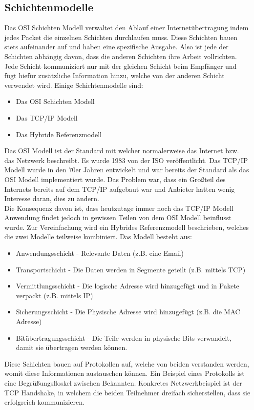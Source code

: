 \documentclass{article}
\begin{document}
	 \subsection{Schichtenmodelle}
	 Das OSI Schichten Modell verwaltet den Ablauf einer Internetübertragung indem jedes Packet die einzelnen Schichten durchlaufen muss. Diese Schichten bauen stets aufeinander auf und haben eine spezifische Ausgabe. Also ist jede der Schichten abhängig davon, dass die anderen Schichten ihre Arbeit vollrichten. Jede Schicht kommuniziert nur mit der gleichen Schicht beim Empfänger und fügt hiefür zusätzliche Information hinzu, welche von der anderen Schicht verwendet wird. Einige Schichtenmodelle sind:
	 \begin{itemize}
	 	\item{Das OSI Schichten Modell}
	 	\item{Das TCP/IP Modell}
	 	\item{Das Hybride Referenzmodell}
	 \end{itemize}
	 Das OSI Modell ist der Standard mit welcher normalerweise das Internet bzw. das Netzwerk beschreibt. Es wurde 1983 von der ISO veröffentlicht. Das TCP/IP Modell wurde in den 70er Jahren entwickelt und war bereits der Standard als das OSI Modell implementiert wurde. Das Problem war, dass ein Großteil des Internets bereits auf dem TCP/IP aufgebaut war und Anbieter hatten wenig Interesse daran, dies zu ändern. \\
	 Die Konsequenz davon ist, dass heutzutage immer noch das TCP/IP Modell Anwendung findet jedoch in gewissen Teilen von dem OSI Modell beinflusst wurde. Zur Vereinfachung wird ein Hybrides Referenzmodell beschrieben, welches die zwei Modelle teilweise kombiniert. Das Modell besteht aus:
	 \begin{itemize}
	 	\item{Anwendungsschicht - Relevante Daten (z.B. eine Email)}
	 	\item{Transportschicht - Die Daten werden in Segmente geteilt (z.B. mittels TCP)}
	 	\item{Vermittlungsschicht - Die logische Adresse wird hinzugefügt und in Pakete verpackt (z.B. mittels IP)}
	 	\item{Sicherungsschicht - Die Physische Adresse wird hinzugefügt (z.B. die MAC Adresse)}
	 	\item{Bitübertragungsschicht - Die Teile werden in physische Bits verwandelt, damit sie übertragen werden können.}
	 \end{itemize}
	 Diese Schichten bauen auf Protokollen auf, welche von beiden verstanden werden, womit diese Informationen austauschen können. Ein Beispiel eines Protokolls ist eine Begrüßungsfloskel zwischen Bekannten. Konkretes Netzwerkbeispiel ist der TCP Handshake, in welchem die beiden Teilnehmer dreifach sicherstellen, dass sie erfolgreich kommunizieren. \\
\end{document}
